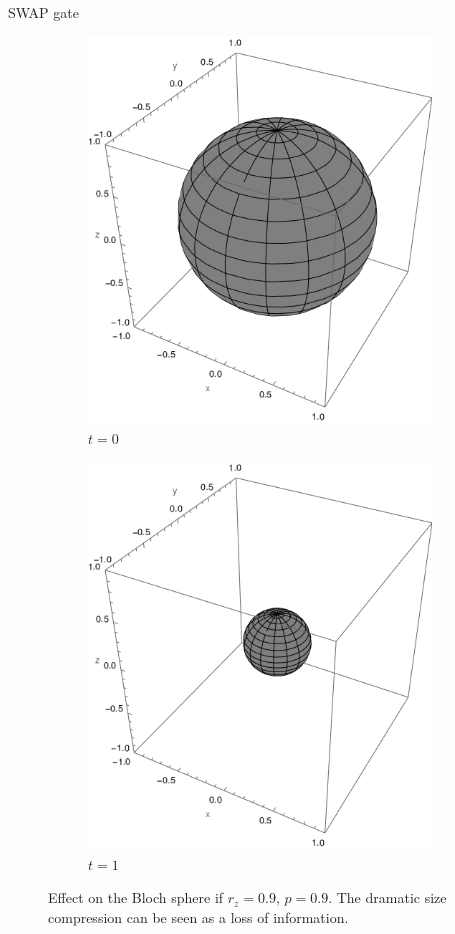 \documentclass{cubeamer}
\begin{document}
\begin{frame}{SWAP gate}
    \begin{figure}[h!]
        \centering
        \begin{subfigure}{0.475\textwidth}
          \centering
          \includegraphics[width=0.6\linewidth]{../notes/log/maxent/figures/sphere_swapcontraction_t=0_z=0.9_p=0.9.png}
          \caption{$t=0$}
        \end{subfigure}%
        \begin{subfigure}{0.475\textwidth}
          \centering
          \includegraphics[width=0.6\linewidth]{../notes/log/maxent/figures/sphere_swapcontraction_t=1_z=0.9_p=0.9.png}
          \caption{$t=1$}
        \end{subfigure}
        \caption{Effect on the Bloch sphere if $r_{z}=0.9$, $p=0.9$. The dramatic size compression can be seen as a loss of information.}
        \label{fig:SWAPFactorSequence}
    \end{figure}
\end{frame}
\end{document}
